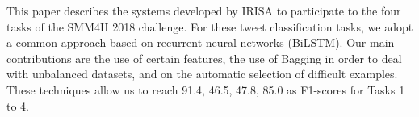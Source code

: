 This paper describes the systems developed by IRISA to participate to the four tasks of the SMM4H 2018 challenge. For these tweet classification tasks, we adopt a common approach based on recurrent neural networks (BiLSTM). Our main contributions are the use of certain features, the use of Bagging in order to deal with unbalanced datasets, and on the automatic selection of difficult examples. These techniques allow us to reach 91.4, 46.5, 47.8, 85.0 as F1-scores for Tasks 1 to 4.
